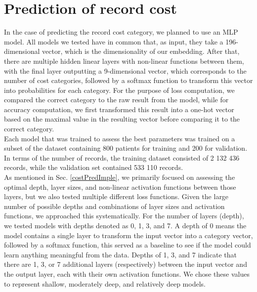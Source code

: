 
\section{Prediction of record cost}
\label{costPredRes}

In the case of predicting the record cost category, we planned to use an MLP model. All models we tested have in common that, as input, they take a 196-dimensional vector, which is the dimensionality of our embedding. After that, there are multiple hidden linear layers with non-linear functions between them, with the final layer outputting a 9-dimensional vector, which corresponds to the number of cost categories, followed by a softmax function to transform this vector into probabilities for each category. For the purpose of loss computation, we compared the correct category to the raw result from the model, while for accuracy computation, we first transformed this result into a one-hot vector based on the maximal value in the resulting vector before comparing it to the correct category.
\\

Each model that was trained to assess the best parameters was trained on a subset of the dataset containing 800 patients for training and 200 for validation. In terms of the number of records, the training dataset consisted of 2 132 436 records, while the validation set contained 533 110 records.
\\

As mentioned in Sec. \ref{costPredImple}, we primarily focused on assessing the optimal depth, layer sizes, and non-linear activation functions between those layers, but we also tested multiple different loss functions. Given the large number of possible depths and combinations of layer sizes and activation functions, we approached this systematically. For the number of layers (depth), we tested models with depths denoted as 0, 1, 3, and 7. A depth of 0 means the model contains a single layer to transform the input vector into a category vector, followed by a softmax function, this served as a baseline to see if the model could learn anything meaningful from the data. Depths of 1, 3, and 7 indicate that there are 1, 3, or 7 additional layers (respectively) between the input vector and the output layer, each with their own activation functions. We chose these values to represent shallow, moderately deep, and relatively deep models.
\\

